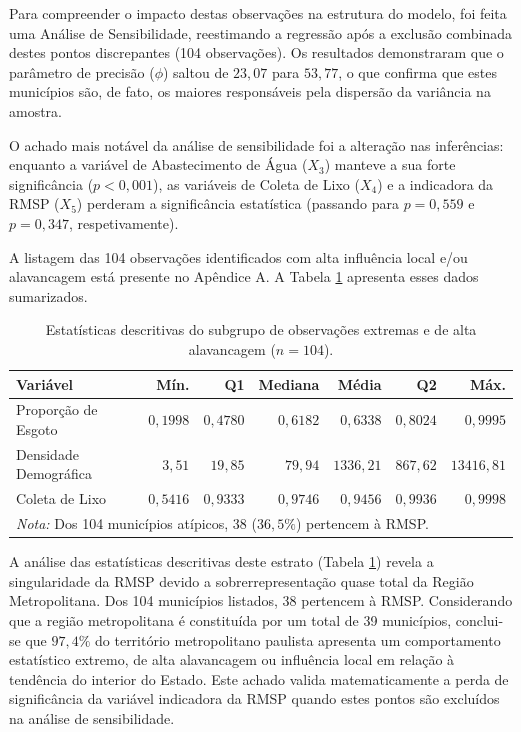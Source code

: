 \documentclass[12pt, a4paper]{article}
\begin{document}
Para compreender o impacto destas observações na estrutura do modelo, foi feita uma Análise de Sensibilidade, reestimando a regressão após a exclusão combinada destes pontos discrepantes (104 observações). Os resultados demonstraram que o parâmetro de precisão ($\phi$) saltou de $23,07$ para $53,77$, o que confirma que estes municípios são, de fato, os maiores responsáveis pela dispersão da variância na amostra.

O achado mais notável da análise de sensibilidade foi a alteração nas inferências: enquanto a variável de Abastecimento de Água ($X_3$) manteve a sua forte significância ($p < 0,001$), as variáveis de Coleta de Lixo ($X_4$) e a indicadora da RMSP ($X_5$) perderam a significância estatística (passando para $p = 0,559$ e $p = 0,347$, respetivamente).

A listagem das 104 observações identificados com alta influência local e/ou alavancagem está presente no Apêndice A. A Tabela \ref{tab:sumario_extremos} apresenta esses dados sumarizados.

\begin{table}[htbp]
\centering
\caption{Estatísticas descritivas do subgrupo de observações extremas e de alta alavancagem ($n = 104$).}
\label{tab:sumario_extremos}
\begin{tabular}{lrrrrrr}
\toprule
\textbf{Variável} & \textbf{Mín.} & \textbf{Q1} & \textbf{Mediana} & \textbf{Média} & \textbf{Q2} & \textbf{Máx.} \\
\midrule
Proporção de Esgoto & $0,1998$ & $0,4780$ & $0,6182$ & $0,6338$ & $0,8024$ & $0,9995$ \\
Densidade Demográfica & $3,51$ & $19,85$ & $79,94$ & $1336,21$ & $867,62$ & $13416,81$ \\
Coleta de Lixo & $0,5416$ & $0,9333$ & $0,9746$ & $0,9456$ & $0,9936$ & $0,9998$ \\
\bottomrule
\multicolumn{7}{l}{\footnotesize \textit{Nota:} Dos 104 municípios atípicos, 38 ($36,5\%$) pertencem à RMSP.}
\end{tabular}
\end{table}

A análise das estatísticas descritivas deste estrato (Tabela \ref{tab:sumario_extremos}) revela a singularidade da RMSP devido a sobrerrepresentação quase total da Região Metropolitana. Dos 104 municípios listados, 38 pertencem à RMSP. Considerando que a região metropolitana é constituída por um total de 39 municípios, conclui-se que $97,4\%$ do território metropolitano paulista apresenta um comportamento estatístico extremo, de alta alavancagem ou influência local em relação à tendência do interior do Estado. Este achado valida matematicamente a perda de significância da variável indicadora da RMSP quando estes pontos são excluídos na análise de sensibilidade.
\end{document}
